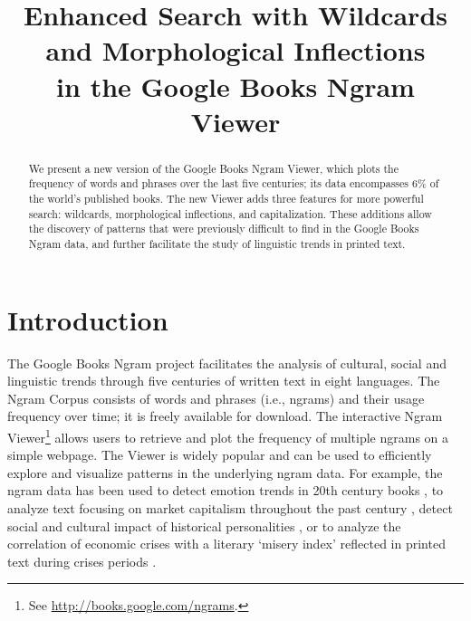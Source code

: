 \documentclass[11pt,a4paper]{article}
\title{Enhanced Search with Wildcards and Morphological Inflections\\in the Google Books Ngram Viewer}
\date{}
\begin{document}
\maketitle

\begin{abstract}

We present a new version of the Google Books Ngram Viewer, which plots
the frequency of words and phrases over the last five
centuries; its data encompasses 6\% of the world's published books.
The new Viewer adds three features for more powerful search: wildcards,
morphological inflections, and capitalization. These additions allow
the discovery of patterns that were previously difficult to find in the Google Books Ngram data,
and further facilitate the study of linguistic trends in printed text.

\end{abstract}

\section{Introduction}

The Google Books Ngram project facilitates the analysis of cultural, social and linguistic trends through five centuries of written text in eight languages. The Ngram Corpus \cite{culturomics,lin2012syntactic} consists of words and phrases (i.e., ngrams) and their usage frequency over time; it is freely available for download. The interactive Ngram Viewer\footnote{See \url{http://books.google.com/ngrams}.} allows users to retrieve and plot the frequency of multiple ngrams on a simple webpage. The Viewer is widely popular and can be used to efficiently explore and visualize patterns in the underlying ngram data. For example, the ngram data has been used to detect emotion trends in 20th century books \cite{acerbi.etal.2013}, to analyze text focusing on market capitalism throughout the past century \cite{Schulz2013}, detect social and cultural impact of historical personalities \cite{skiena.ward.2013}, or to analyze the correlation of economic crises with a literary `misery index' reflected in printed text during crises periods \cite{bentley.et.al.2014}.
\end{document}
